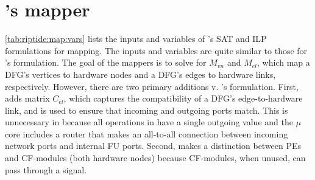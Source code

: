 \section{\riptide's mapper}
\label{appendix:riptide}

\begin{table}[h]
  \centering

	\caption{Inputs \& variables of \riptide's ILP \& SAT formulations.}
	\label{tab:riptide:map:vars}
\end{table}

\autoref{tab:riptide:map:vars} lists the inputs and variables of \riptide's SAT and ILP formulations for mapping.
% 
The inputs and variables are quite similar to those for \snafu's formulation.
% 
The goal of the mappers is to solve for $M_{vn}$ and $M_{el}$, which map a DFG's vertices to hardware nodes and a DFG's edges to hardware links, respectively. 
% 
However, there are two primary additions v. \snafu's formulation.
% 
First, \riptide adds matrix $C_{el}$, which captures the compatibility of a DFG's edge-to-hardware link, and is used to ensure that incoming and outgoing ports match.
% 
This is unnecessary in \snafu because all operations in \snafu have a single outgoing value and the \snafu $\mu$core includes a router that makes an all-to-all connection between incoming network ports and internal FU ports.
% 
Second, \riptide makes a distinction between PEs and CF-modules (both hardware nodes) because CF-modules, when unused, can pass through a signal.

